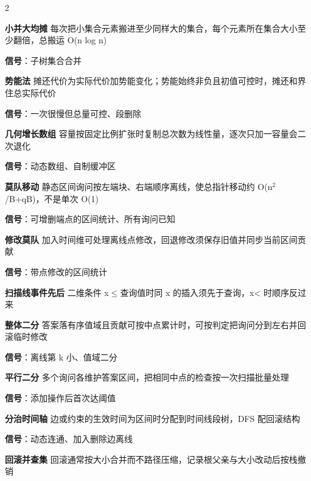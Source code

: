 \documentclass[UTF8,fontset=fandol,a4paper,twoside]{ctexart}
\begin{document}
\begin{multicols}{2}
\par\textbf{小并大均摊}\quad
每次把小集合元素搬进至少同样大的集合，每个元素所在集合大小至少翻倍，总搬运 O(\allowbreak{}n log n)\allowbreak{}\par
\textbf{信号}：子树集合合并\par
\par\textbf{势能法}\quad
摊还代价为实际代价加势能变化；势能始终非负且初值可控时，摊还和界住总实际代价\par
\textbf{信号}：一次很慢但总量可控、段删除\par
\par\textbf{几何增长数组}\quad
容量按固定比例扩张时复制总次数为线性量，逐次只加一容量会二次退化\par
\textbf{信号}：动态数组、自制缓冲区\par
\par\textbf{莫队移动}\quad
静态区间询问按左端块、右端顺序离线，使总指针移动约 O(\allowbreak{}n\ensuremath{^2}/\allowbreak{}B+\allowbreak{}qB)\allowbreak{}，不是单次 O(\allowbreak{}1)\allowbreak{}\par
\textbf{信号}：可增删端点的区间统计、所有询问已知\par
\par\textbf{修改莫队}\quad
加入时间维可处理离线点修改，回退修改须保存旧值并同步当前区间贡献\par
\textbf{信号}：带点修改的区间统计\par
\par\textbf{扫描线事件先后}\quad
二维条件 x\ensuremath{\le}查询值时同 x 的插入须先于查询，x<\allowbreak{} 时顺序反过来\par
\par\textbf{整体二分}\quad
答案落有序值域且贡献可按中点累计时，可按判定把询问分到左右并回滚临时修改\par
\textbf{信号}：离线第 k 小、值域二分\par
\par\textbf{平行二分}\quad
多个询问各维护答案区间，把相同中点的检查按一次扫描批量处理\par
\textbf{信号}：添加操作后首次达阈值\par
\par\textbf{分治时间轴}\quad
边或约束的生效时间为区间时分配到时间线段树，DFS 配回滚结构\par
\textbf{信号}：动态连通、加入删除边离线\par
\par\textbf{回滚并查集}\quad
回滚通常按大小合并而不路径压缩，记录根父亲与大小改动后按栈撤销\par

\end{multicols}
\end{document}
